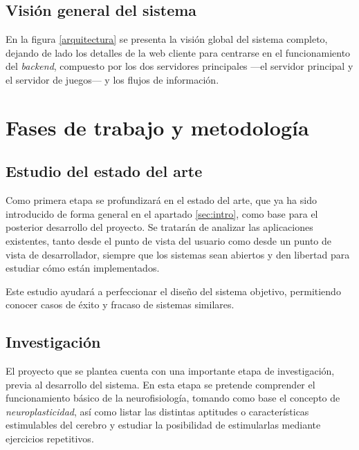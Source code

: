 \documentclass[12pt,a4paper]{article}
\begin{document}
\subsection{Visión general del sistema}

En la figura \ref{arquitectura} se presenta la visión global del sistema completo, dejando de lado los detalles de la web cliente para centrarse en el funcionamiento del {\it backend}, compuesto por los dos servidores principales ---el servidor principal y el servidor de juegos--- y los flujos de información.

\section{Fases de trabajo y metodología}


\subsection{Estudio del estado del arte}

Como primera etapa se profundizará en el estado del arte, que ya ha sido introducido de forma general en el apartado \ref{sec:intro}, como base para el posterior desarrollo del proyecto. Se tratarán de analizar las aplicaciones existentes, tanto desde el punto de vista del usuario como desde un punto de vista de desarrollador, siempre que los sistemas sean abiertos y den libertad para estudiar cómo están implementados.

Este estudio ayudará a perfeccionar el diseño del sistema objetivo, permitiendo conocer casos de éxito y fracaso de sistemas similares.

\subsection{Investigación}

El proyecto que se plantea cuenta con una importante etapa de investigación, previa al desarrollo del sistema. En esta etapa se pretende comprender el funcionamiento básico de la neurofisiología, tomando como base el concepto de {\it neuroplasticidad}, así como listar las distintas aptitudes o características estimulables del cerebro y estudiar la posibilidad de estimularlas mediante ejercicios repetitivos.
\end{document}
